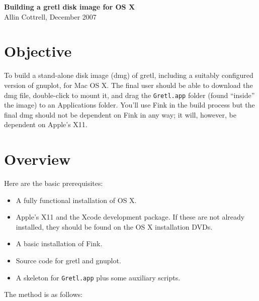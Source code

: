 \documentclass{article}
\begin{document}
\setlength{\parskip}{1ex}
\setlength{\parindent}{0pt}

\begin{center}
  {\Large \textbf{Building a gretl disk image for OS X}}\\[6pt]
Allin Cottrell, December 2007
\end{center}

\section{Objective}

To build a stand-alone disk image (dmg) of gretl, including a suitably
configured version of gnuplot, for Mac OS X.  The final user should be
able to download the dmg file, double-click to mount it, and drag the
\texttt{Gretl.app} folder (found ``inside'' the image) to an
Applications folder.  You'll use Fink in the build process but the
final dmg should not be dependent on Fink in any way; it will,
however, be dependent on Apple's X11.

\section{Overview}

Here are the basic prerequisites:

\begin{itemize}
\item A fully functional installation of OS X.
\item Apple's X11 and the Xcode development package.  If these are
  not already installed, they should be found on the OS X installation
  DVDs.
\item A basic installation of Fink.
\item Source code for gretl and gnuplot.
\item A skeleton for \texttt{Gretl.app} plus some auxiliary scripts.
\end{itemize}

The method is as follows:
\end{document}
